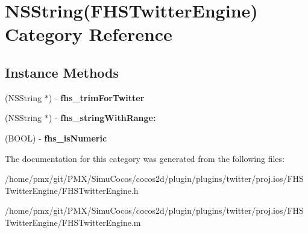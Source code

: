 \hypertarget{categoryNSString_07FHSTwitterEngine_08}{}\section{N\+S\+String(F\+H\+S\+Twitter\+Engine) Category Reference}
\label{categoryNSString_07FHSTwitterEngine_08}
\subsection*{Instance Methods}
\begin{DoxyCompactItemize}
\item 
\mbox{\label{categoryNSString_07FHSTwitterEngine_08_a63f946e8847271a186a0361b796d12da}} 
(N\+S\+String $\ast$) -\/ {\bfseries fhs\+\_\+trim\+For\+Twitter}
\item 
\mbox{\label{categoryNSString_07FHSTwitterEngine_08_a4e17b86f66134cd56a4140c49bf4a4cf}} 
(N\+S\+String $\ast$) -\/ {\bfseries fhs\+\_\+string\+With\+Range\+:}
\item 
\mbox{\label{categoryNSString_07FHSTwitterEngine_08_a5e6164650af4192ae28561f2bb162cab}} 
(B\+O\+OL) -\/ {\bfseries fhs\+\_\+is\+Numeric}
\end{DoxyCompactItemize}


The documentation for this category was generated from the following files\+:\begin{DoxyCompactItemize}
\item 
/home/pmx/git/\+P\+M\+X/\+Simu\+Cocos/cocos2d/plugin/plugins/twitter/proj.\+ios/\+F\+H\+S\+Twitter\+Engine/F\+H\+S\+Twitter\+Engine.\+h\item 
/home/pmx/git/\+P\+M\+X/\+Simu\+Cocos/cocos2d/plugin/plugins/twitter/proj.\+ios/\+F\+H\+S\+Twitter\+Engine/F\+H\+S\+Twitter\+Engine.\+m\end{DoxyCompactItemize}
